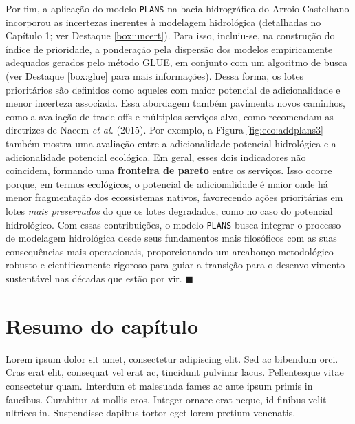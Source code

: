\documentclass[./main.tex]{subfiles}
\begin{document}
\par Por fim, a aplicação do modelo \texttt{PLANS} na bacia hidrográfica do Arroio Castelhano incorporou as incertezas inerentes à modelagem hidrológica (detalhadas no Capítulo 1; ver Destaque \ref{box:uncert}). Para isso, incluiu-se, na construção do índice de prioridade, a ponderação pela dispersão dos modelos empiricamente adequados gerados pelo método GLUE, em conjunto com um algoritmo de busca (ver Destaque \ref{box:glue} para mais informações). Dessa forma, os lotes prioritários são definidos como aqueles com maior potencial de adicionalidade e menor incerteza associada. Essa abordagem também pavimenta novos caminhos, como a avaliação de trade-offs e múltiplos serviços-alvo, como recomendam as diretrizes de Naeem \textit{et al.} (2015). Por exemplo, a Figura \ref{fig:eco:addplans3} também mostra uma avaliação entre a adicionalidade potencial hidrológica e a adicionalidade potencial ecológica. Em geral, esses dois indicadores não coincidem, formando uma \textbf{fronteira de pareto} entre os serviços. Isso ocorre porque, em termos ecológicos, o potencial de adicionalidade é maior onde há menor fragmentação dos ecossistemas nativos, favorecendo ações prioritárias em lotes \textit{mais preservados} do que os lotes degradados, como no caso do potencial hidrológico. Com essas contribuições, o modelo \texttt{PLANS} busca integrar o processo de modelagem hidrológica desde seus fundamentos mais filosóficos com as suas consequências mais operacionais, proporcionando um arcabouço metodológico robusto e cientificamente rigoroso para guiar a transição para o desenvolvimento sustentável nas décadas que estão por vir. $\blacksquare$

\clearpage

\section{Resumo do capítulo}

\par Lorem ipsum dolor sit amet, consectetur adipiscing elit. Sed ac bibendum orci. Cras erat elit, consequat vel erat ac, tincidunt pulvinar lacus. Pellentesque vitae consectetur quam. Interdum et malesuada fames ac ante ipsum primis in faucibus. Curabitur at mollis eros. Integer ornare erat neque, id finibus velit ultrices in. Suspendisse dapibus tortor eget lorem pretium venenatis.
\end{document}
